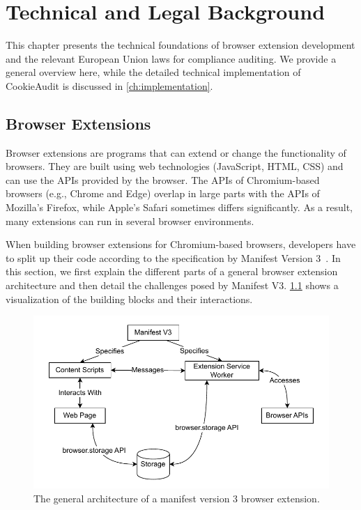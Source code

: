 \chapter{Technical and Legal Background}

This chapter presents the technical foundations of browser extension development and the relevant European Union laws for compliance auditing. We provide a general overview here, while the detailed technical implementation of CookieAudit is discussed in \cref{ch:implementation}.

\section{Browser Extensions}

Browser extensions are programs that can extend or change the functionality of browsers.
They are built using web technologies (JavaScript, HTML, CSS) and can use the APIs provided by the browser.
The APIs of Chromium-based browsers (e.g., Chrome and Edge) overlap in large parts with the APIs of Mozilla's Firefox, while Apple's Safari sometimes differs significantly.
As a result, many extensions can run in several browser environments.

When building browser extensions for Chromium-based browsers, developers have to split up their code according to the specification by Manifest Version 3~\cite{manifestv3}.
In this section, we first explain the different parts of a general browser extension architecture and then detail the challenges posed by Manifest V3.
\cref{fig:extension-architecture} shows a visualization of the building blocks and their interactions.

\begin{figure}
	\centering
	\includegraphics[width=\textwidth]{media/browser-extension-architecture.drawio.pdf}
    \caption{The general architecture of a manifest version 3 browser extension.}
    \label{fig:extension-architecture}
\end{figure}

